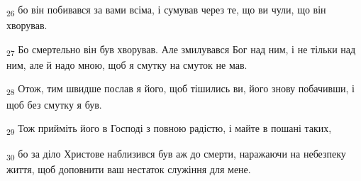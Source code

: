 \begin{tcolorbox}
\textsubscript{26} бо він побивався за вами всіма, і сумував через те, що ви чули, що він хворував.
\end{tcolorbox}
\begin{tcolorbox}
\textsubscript{27} Бо смертельно він був хворував. Але змилувався Бог над ним, і не тільки над ним, але й надо мною, щоб я смутку на смуток не мав.
\end{tcolorbox}
\begin{tcolorbox}
\textsubscript{28} Отож, тим швидше послав я його, щоб тішились ви, його знову побачивши, і щоб без смутку я був.
\end{tcolorbox}
\begin{tcolorbox}
\textsubscript{29} Тож прийміть його в Господі з повною радістю, і майте в пошані таких,
\end{tcolorbox}
\begin{tcolorbox}
\textsubscript{30} бо за діло Христове наблизився був аж до смерти, наражаючи на небезпеку життя, щоб доповнити ваш нестаток служіння для мене.
\end{tcolorbox}
